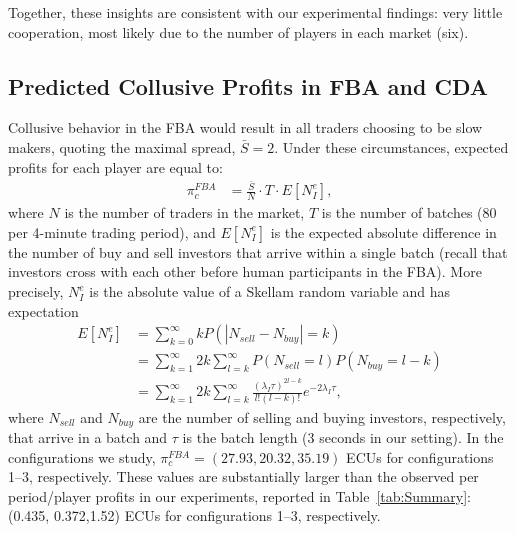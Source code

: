 \documentclass[12pt]{article}
\begin{document}
\begin{appendices}
Together, these insights are consistent with our experimental findings: very little cooperation, most likely due to the number of players in each market (six).

\subsection{Predicted Collusive Profits in FBA and CDA}
Collusive behavior in the FBA would result in all traders choosing to be slow makers, quoting the maximal spread, $\bar{S} = 2$. 
Under these circumstances, expected profits for each player are equal to: 
\begin{align}
\pi_{c}^{FBA} & = \frac{\bar{S}}{N} \cdot T \cdot E [N_I^e],
\end{align}
where $N$ is the number of traders in the market, $T$ is the number of batches (80 per 4-minute trading period),  and $E[N_I^e]$ is the expected absolute difference in the number of buy and sell investors that arrive within a single batch (recall that investors cross with each other before human participants in the FBA). More precisely, $N_I^e$ is the absolute value of a Skellam random variable and has expectation
\begin{align}
    E[N_I^e] & = \sum_{k=0}^{\infty} k P(|N_{sell}-N_{buy}| = k) \\
    & = \sum_{k=1}^{\infty} 2k \sum_{l=k}^{\infty} P(N_{sell}=l) P(N_{buy}=l-k) \\
    & = \sum_{k=1}^{\infty} 2k \sum_{l=k}^{\infty} \frac{\left(\lambda_I \tau\right)^{2l-k}}{l! (l-k)!} e^{-2 \lambda_I \tau},
\end{align}
where $N_{sell}$ and $N_{buy}$ are the number of selling and buying investors, respectively, that arrive in a batch and $\tau$ is the batch length (3 seconds in our setting).
In the configurations we study, $\pi_{c}^{FBA} = (27.93, 20.32, 35.19)$ ECUs for configurations 1--3, respectively.
These values are substantially larger than the observed per period/player profits in our experiments, reported in Table~\ref{tab:Summary}: (0.435, 0.372,1.52) ECUs for configurations 1--3, respectively.


\end{appendices}
\end{document}
